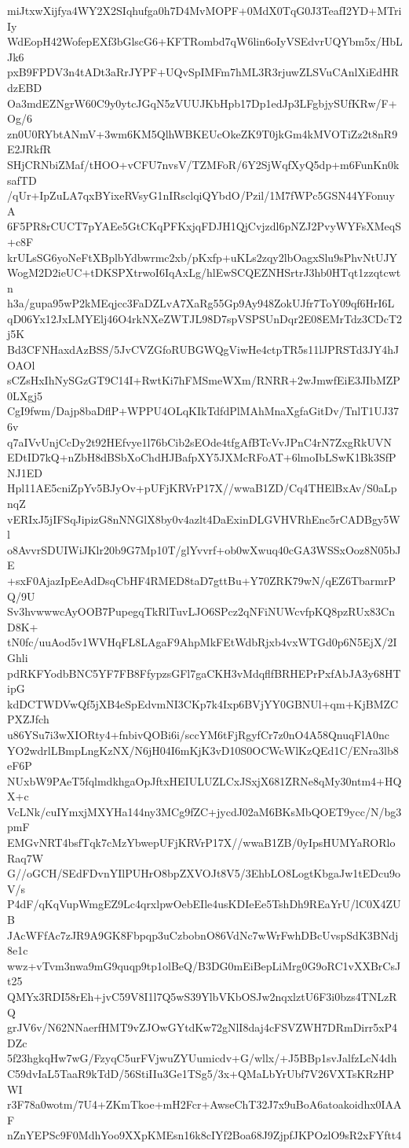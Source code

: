 miJtxwXijfya4WY2X2SIqhufga0h7D4MvMOPF+0MdX0TqG0J3TeafI2YD+MTriIy
WdEopH42WofepEXf3bGlscG6+KFTRombd7qW6lin6oIyVSEdvrUQYbm5x/HbLJk6
pxB9FPDV3n4tADt3aRrJYPF+UQvSpIMFm7hML3R3rjuwZLSVuCAnlXiEdHRdzEBD
Oa3mdEZNgrW60C9y0ytcJGqN5zVUUJKbHpb17Dp1edJp3LFgbjySUfKRw/F+Og/6
zn0U0RYbtANmV+3wm6KM5QlhWBKEUcOkeZK9T0jkGm4kMVOTiZz2t8nR9E2JRkfR
SHjCRNbiZMaf/tHOO+vCFU7nvsV/TZMFoR/6Y2SjWqfXyQ5dp+m6FunKn0ksafTD
/qUr+IpZuLA7qxBYixeRVsyG1nIRsclqiQYbdO/Pzil/1M7fWPc5GSN44YFonuyA
6F5PR8rCUCT7pYAEe5GtCKqPFKxjqFDJH1QjCvjzdl6pNZJ2PvyWYFsXMeqS+c8F
krULsSG6yoNeFtXBplbYdbwrmc2xb/pKxfp+uKLs2zqy2lbOagxSlu9sPhvNtUJY
WogM2D2ieUC+tDKSPXtrwoI6IqAxLg/hlEwSCQEZNHSrtrJ3hb0HTqt1zzqtcwtn
h3a/gupa95wP2kMEqjcc3FaDZLvA7XaRg55Gp9Ay948ZokUJfr7ToY09qf6HrI6L
qD06Yx12JxLMYElj46O4rkNXeZWTJL98D7spVSPSUnDqr2E08EMrTdz3CDcT2j5K
Bd3CFNHaxdAzBSS/5JvCVZGfoRUBGWQgViwHe4ctpTR5s11lJPRSTd3JY4hJOAOl
sCZsHxIhNySGzGT9C14I+RwtKi7hFMSmeWXm/RNRR+2wJmwfEiE3JIbMZP0LXgj5
CgI9fwm/Dajp8baDflP+WPPU4OLqKIkTdfdPlMAhMnaXgfaGitDv/TnlT1UJ376v
q7aIVvUnjCcDy2t92HEfvye1l76bCib2sEOde4tfgAfBTcVvJPnC4rN7ZxgRkUVN
EDtID7kQ+nZbH8dBSbXoChdHJBafpXY5JXMcRFoAT+6lmoIbLSwK1Bk3SfPNJ1ED
Hpl11AE5cniZpYv5BJyOv+pUFjKRVrP17X//wwaB1ZD/Cq4THElBxAv/S0aLpnqZ
vERIxJ5jIFSqJipizG8nNNGlX8by0v4azlt4DaExinDLGVHVRhEnc5rCADBgy5Wl
o8AvvrSDUIWiJKlr20b9G7Mp10T/glYvvrf+ob0wXwuq40cGA3WSSxOoz8N05bJE
+sxF0AjazIpEeAdDsqCbHF4RMED8taD7gttBu+Y70ZRK79wN/qEZ6TbarmrPQ/9U
Sv3hvwwwcAyOOB7PupegqTkRlTuvLJO6SPcz2qNFiNUWcvfpKQ8pzRUx83CnD8K+
tN0fc/uuAod5v1WVHqFL8LAgaF9AhpMkFEtWdbRjxb4vxWTGd0p6N5EjX/2IGhli
pdRKFYodbBNC5YF7FB8FfypzsGFl7gaCKH3vMdqflfBRHEPrPxfAbJA3y68HTipG
kdDCTWDVwQf5jXB4eSpEdvmNI3CKp7k4Ixp6BVjYY0GBNUl+qm+KjBMZCPXZJfch
u86YSu7i3wXIORty4+fnbivQOBi6i/sccYM6tFjRgyfCr7z0nO4A58QnuqFlA0nc
YO2wdrlLBmpLngKzNX/N6jH04I6mKjK3vD10S0OCWcWlKzQEd1C/ENra3lb8eF6P
NUxbW9PAeT5fqlmdkhgaOpJftxHEIULUZLCxJSxjX681ZRNe8qMy30ntm4+HQX+c
VcLNk/cuIYmxjMXYHa144ny3MCg9fZC+jycdJ02aM6BKsMbQOET9ycc/N/bg3pmF
EMGvNRT4bsfTqk7cMzYbwepUFjKRVrP17X//wwaB1ZB/0yIpsHUMYaRORloRaq7W
G//oGCH/SEdFDvnYIlPUHrO8bpZXVOJt8V5/3EhbLO8LogtKbgaJw1tEDcu9oV/s
P4dF/qKqVupWmgEZ9Lc4qrxlpwOebEIle4usKDIeEe5TshDh9REaYrU/lC0X4ZUB
JAcWFfAc7zJR9A9GK8Fbpqp3uCzbobnO86VdNc7wWrFwhDBcUvspSdK3BNdj8e1c
wwz+vTvm3nwa9mG9quqp9tp1olBeQ/B3DG0mEiBepLiMrg0G9oRC1vXXBrCsJt25
QMYx3RDI58rEh+jvC59V8I1l7Q5wS39YlbVKbOSJw2nqxlztU6F3i0bzs4TNLzRQ
grJV6v/N62NNaerfHMT9vZJOwGYtdKw72gNlI8daj4cFSVZWH7DRmDirr5xP4DZc
5f23hgkqHw7wG/FzyqC5urFVjwuZYUumicdv+G/wllx/+J5BBp1svJalfzLcN4dh
C59dvIaL5TaaR9kTdD/56StiIIu3Ge1TSg5/3x+QMaLbYrUbf7V26VXTsKRzHPWI
r3F78a0wotm/7U4+ZKmTkoe+mH2Fcr+AwseChT32J7x9uBoA6atoakoidhx0IAAF
nZnYEPSc9F0MdhYoo9XXpKMEsn16k8cIYf2Boa68J9ZjpfJKPOzlO9sR2xFYftt4
